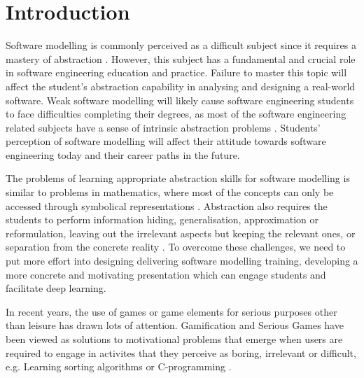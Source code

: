 \documentclass[runningheads,a4paper]{llncs}
\begin{document}
\section{Introduction}
Software modelling is commonly perceived as a difficult subject since it requires a mastery of abstraction \cite{Borstler2012}. However, this subject has a fundamental and crucial role in software engineering education and practice. Failure to master this topic will affect the student’s abstraction capability in analysing and designing a real-world software. Weak software modelling will likely cause software engineering students to face difficulties completing their degrees, as most of the software engineering related subjects have a sense of intrinsic abstraction problems \cite{Kramer2007}. Students' perception of software modelling will affect their attitude towards software engineering today and their career paths in the future.

The problems of learning appropriate abstraction skills for software modelling is similar to problems in mathematics, where most of the concepts can only be accessed through symbolical representations \cite{Duval2006}. Abstraction also requires the students to perform information hiding, generalisation, approximation or reformulation, leaving out the irrelevant aspects but keeping the relevant ones, or separation from the concrete reality \cite{Saitta2013}. To overcome these challenges, we need to put more effort into designing delivering software modelling training, developing a more concrete and motivating presentation which can engage students and facilitate deep learning.

In recent years, the use of games or game elements for serious purposes other than leisure has drawn lots of attention. Gamification \cite{deterding2011game} and Serious Games \cite{Michael2005} have been viewed as solutions to motivational problems that emerge when users are required to engage in activites that they perceive as boring, irrelevant or difficult, e.g. Learning sorting algorithms \cite{Yohannis2015} or C-programming \cite{Ibanez2014}.
\end{document}
